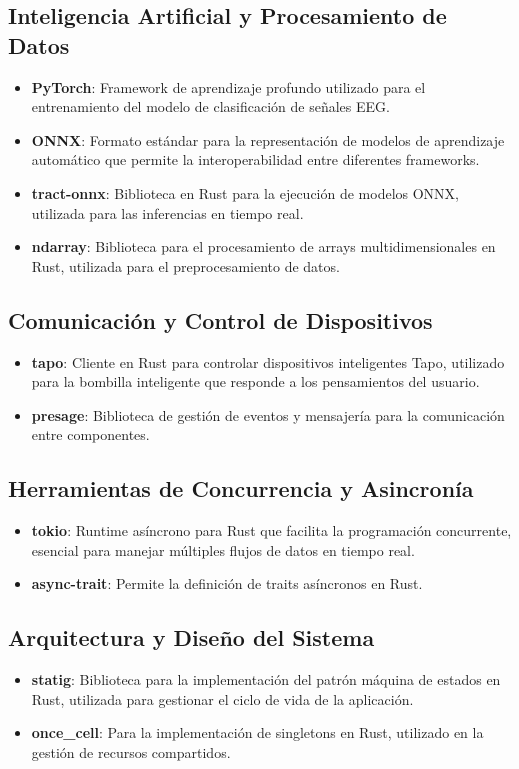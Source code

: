 \subsection{Inteligencia Artificial y Procesamiento de Datos}
\begin{itemize}
    \item \textbf{PyTorch}: Framework de aprendizaje profundo utilizado para el entrenamiento del modelo de clasificación de señales EEG.
    \item \textbf{ONNX}: Formato estándar para la representación de modelos de aprendizaje automático que permite la interoperabilidad entre diferentes frameworks.
    \item \textbf{tract-onnx}: Biblioteca en Rust para la ejecución de modelos ONNX, utilizada para las inferencias en tiempo real.
    \item \textbf{ndarray}: Biblioteca para el procesamiento de arrays multidimensionales en Rust, utilizada para el preprocesamiento de datos.
\end{itemize}

\subsection{Comunicación y Control de Dispositivos}
\begin{itemize}
    \item \textbf{tapo}: Cliente en Rust para controlar dispositivos inteligentes Tapo, utilizado para la bombilla inteligente que responde a los pensamientos del usuario.
    \item \textbf{presage}: Biblioteca de gestión de eventos y mensajería para la comunicación entre componentes.
\end{itemize}

\subsection{Herramientas de Concurrencia y Asincronía}
\begin{itemize}
    \item \textbf{tokio}: Runtime asíncrono para Rust que facilita la programación concurrente, esencial para manejar múltiples flujos de datos en tiempo real.
    \item \textbf{async-trait}: Permite la definición de traits asíncronos en Rust.
\end{itemize}

\subsection{Arquitectura y Diseño del Sistema}
\begin{itemize}
    \item \textbf{statig}: Biblioteca para la implementación del patrón máquina de estados en Rust, utilizada para gestionar el ciclo de vida de la aplicación.
    \item \textbf{once\_cell}: Para la implementación de singletons en Rust, utilizado en la gestión de recursos compartidos.
\end{itemize}

